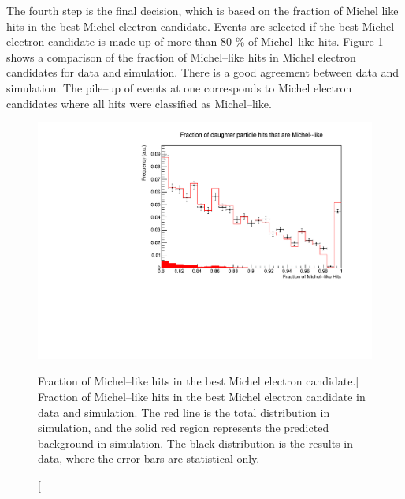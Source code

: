 The fourth step is the final decision, which is based on the fraction of Michel
like hits in the best Michel electron candidate. Events are selected if the 
best Michel electron candidate is made up of more than 80 \% of Michel--like 
hits. Figure \ref{fig:michel_like_frac} shows a comparison of the fraction of 
Michel--like hits in Michel electron candidates for \protodune{} data and 
simulation. There is a good agreement between data and simulation. The pile--up
of events at one corresponds to Michel electron candidates where all hits were 
classified as Michel--like.
\begin{figure}
	\centering
	\includegraphics[width=\textwidth]{figures/michel_like_frac.pdf}
	\caption
	[Fraction of Michel--like hits in the best Michel electron candidate.]
	{Fraction of Michel--like hits in the best Michel electron candidate in data
	and simulation. The red line is the total distribution in simulation, and the 
	solid red region represents the predicted background in simulation. The black
	distribution is the results in data, where the error bars are statistical 
	only.}
	\label{fig:michel_like_frac}
\end{figure}

